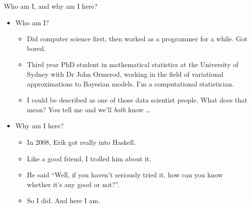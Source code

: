 \documentclass{beamer}
\begin{document}
\begin{frame}{Who am I, and why am I here?}
\begin{itemize}
\item Who am I?
\begin{itemize}
\item Did computer science first, then worked as a programmer for a while. Got bored.
\item Third year PhD student in mathematical statistics at the University of Sydney with Dr John Ormerod, 
			working in the field of variational approximations to Bayesian models. I'm a computational statistician.
\item I could be described as one of those data scientist people. What does that mean? You tell me and we'll
			\emph{both} know \ldots
\end{itemize}

\item Why am I here?
\begin{itemize}
\item In 2008, Erik got really into Haskell.\\
\item Like a good friend, I trolled him about it.\\
\item He said ``Well, if you haven't seriously tried it, how can you know whether it's
			any good or not?''.\\
\item So I did. And here I am.
\end{itemize}
\end{itemize}
\end{frame}
\end{document}
